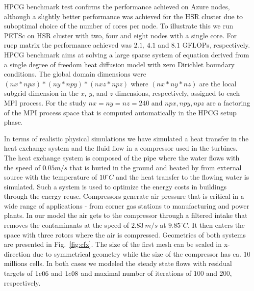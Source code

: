 \documentclass[3p,times]{elsarticle}
\begin{document}
HPCG benchmark test confirms the performance achieved on Azure nodes, although a slightly better performance was achieved for the HSR cluster due to suboptimal choice of the number of cores per node.  To illustrate this we run PETSc on HSR cluster with two, four and eight nodes with a single core. For ruep matrix the performance achieved was $2.1$, $4.1$ and $8.1$ GFLOPs, respectively. HPCG benchmark aims at solving a large sparse system of equation derived from a single degree of freedom heat diffusion model with zero Dirichlet boundary conditions. The global domain dimensions were $(nx * npx ) * (ny * npy ) * (nxz * npz )$ where $(nx * ny * nz )$ are the local subgrid dimension in the $x$, $y$, and $z$ dimensions, respectively, assigned to each MPI process. For the study $nx = ny = nz = 240$ and $npx, npy, npz$ are a factoring of the MPI process space that is computed automatically in the HPCG setup phase.

In terms of realistic physical simulations we have simulated a heat transfer in the heat exchange system and the fluid flow in a compressor used in the turbines. The heat exchange system is composed of the  pipe where the water flows with the speed of $0.05 m/s$ that is buried in the ground and heated by from external source with the temperature of $10 ^\circ C$ and the heat transfer to the flowing water is simulated. Such a system is used to optimize the energy costs in buildings through the energy reuse.  
Compressors generate air pressure that is critical in a wide range of applications - from corner gas stations to manufacturing and power plants. In our model the air gets to the compressor through a filtered intake that removes the contaminants at the speed of $2.83\ m/s$ at $9.85 ^\circ C$. It then enters the space with three rotors where the air is compressed. Geometries of both systems are presented in Fig.~\ref{fig:cfx}. The size of the first mesh can be scaled  in x-direction due to symmetrical geometry while the size of the compressor has ca. 10 millions cells. In both cases we modeled the steady state flows with residual targets of $1e\-06$ and $1e\-08$ and maximal number of iterations of $100$ and $200$, respectively.
\end{document}

